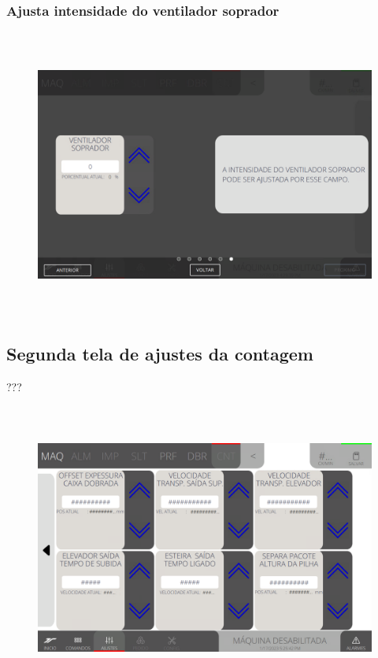 \newpage
\thispagestyle{fancy}
\vspace*{\fill}
\subsubsection{\small{Ajusta intensidade do ventilador soprador}}
\begin{figure}[h]
  \centering
  \includegraphics[width=576px,height=360px]{src/imagesFlexo/08-count/settings/e-6.png}
\end{figure}
\vspace*{\fill}

\newpage
\thispagestyle{fancy}
\vspace*{\fill}
\subsection{Segunda tela de ajustes da contagem}
 ???
\begin{figure}[h]
  \centering
  \includegraphics[width=576px,height=360px]{src/imagesFlexo/08-count/settings/e-Tela-Principal-2.png}
\end{figure}

